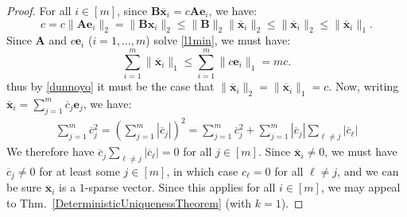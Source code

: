 \documentclass{ucbthesis}
\begin{document}
\begin{proof}
For all $i \in [m]$, since $\mathbf{B \overline x}_i = c\mathbf{Ae}_i$, we have:
\begin{equation}\label{dunnoyo}
c = c \|\mathbf{Ae}_i\|_2 = \|\mathbf{Bx}_i\|_2 \leq \|\mathbf{B}\|_2 \|\mathbf{\overline x}_i\|_2 \leq \|\mathbf{\overline x}_i\|_2 \leq \|\mathbf{\overline x}_i\|_1.
\end{equation}
Since $\mathbf{A}$ and $c \mathbf{e}_i$ ($i = 1, \ldots, m$) solve \eqref{l1min}, we must have:
\begin{equation}
\sum_{i=1}^m \|\mathbf{\overline x}_i\|_1 \leq \sum_{i=1}^m \|c \mathbf{e}_i\|_1 = m c .
\end{equation}
thus by \eqref{dunnoyo} it must be the case that $\|\mathbf{\overline x}_i\|_2 = \|\mathbf{\overline x}_i\|_1 = c$.  Now, writing $\mathbf{\overline x}_i = \sum_{j=1}^m \overline c_j\mathbf{e}_j$, we have:
\begin{align}
\sum_{j=1}^m \overline c_j^2 =  \left( \sum_{j=1}^m  |\overline c_j| \right)^2 = \sum_{j=1}^m \overline c_j^2 + \sum_{j=1}^m |\overline c_j |\sum_{\ell \neq j} | \overline c_\ell |
\end{align}
We therefore have $\overline c_j \sum_{\ell \neq j} | \overline c_\ell | = 0$ for all $j \in [m]$. Since $\mathbf{\overline x}_i \neq 0$, we must have $\overline c_j \neq 0$ for at least some $j \in [m]$, in which case $c_\ell = 0$ for all $\ell \neq j$, and we can be sure $\mathbf{\overline x}_i$ is a $1$-sparse vector. Since this applies for all $i \in [m]$, we may appeal to Thm.~\ref{DeterministicUniquenessTheorem} (with $k=1$).
\end{proof}
\end{document}
